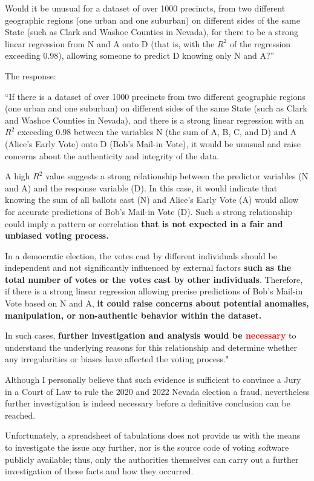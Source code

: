 \documentclass[preprint,13pt]{elsarticle}
\begin{document}
Would it be unusual for a dataset of over 1000 precincts, from two different geographic regions (one urban and one suburban) on different sides of the same State (such as Clark and Washoe Counties in Nevada), for there to be a strong linear regression from N and A onto D (that is, with the $R^2$ of the regression exceeding 0.98), allowing someone to predict D knowing only N and A?”

The response:

``If there is a dataset of over 1000 precincts from two different geographic regions (one urban and one suburban) on different sides of the same State (such as Clark and Washoe Counties in Nevada), and there is a strong linear regression with an $R^2$ exceeding 0.98 between the variables N (the sum of A, B, C, and D) and A (Alice's Early Vote) onto D (Bob's Mail-in Vote), it would be unusual and raise concerns about the authenticity and integrity of the data.

A high $R^2$ value suggests a strong relationship between the predictor variables (N and A) and the response variable (D). In this case, it would indicate that knowing the sum of all ballots cast (N) and Alice's Early Vote (A) would allow for accurate predictions of Bob's Mail-in Vote (D). Such a strong relationship could imply a pattern or correlation \textbf{that is not expected in a fair and unbiased voting process.}

In a democratic election, the votes cast by different individuals should be independent and not significantly influenced by external factors \textbf{such as the total number of votes or the votes cast by other individuals}. Therefore, if there is a strong linear regression allowing precise predictions of Bob's Mail-in Vote based on N and A, \textbf{it could raise concerns about potential anomalies, manipulation, or non-authentic behavior within the dataset.}

In such cases, \textbf{further investigation and analysis would be \textcolor{red}{necessary}} to understand the underlying reasons for this relationship and determine whether any irregularities or biases have affected the voting process."

Although I personally believe that such evidence is sufficient to convince a Jury in a Court of Law to rule the 2020 and 2022 Nevada election a fraud, nevertheless further investigation is indeed necessary before a definitive conclusion can be reached.

Unfortunately, a spreadsheet of tabulations does not provide us with the means to investigate the issue any further, nor is the source code of voting software publicly available; thus, only the authorities themselves can carry out a further investigation of these facts and how they occurred.
\end{document}
